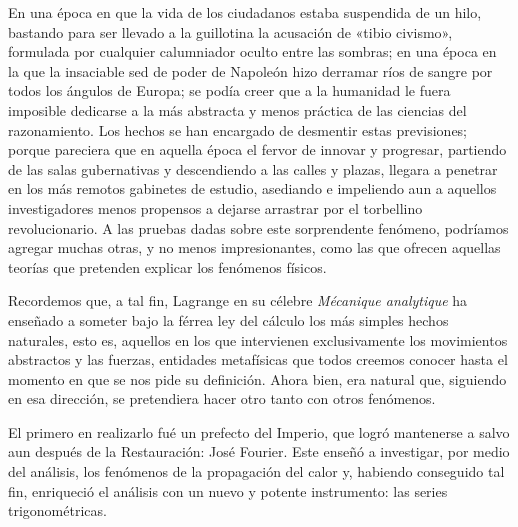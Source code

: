\documentclass[a4paper, 12pt, draft]{article}
\begin{document}
{{En una época en que la vida de los ciudadanos estaba suspendida de un hilo, bastando para ser llevado a la guillotina la acusación de «tibio civismo», formulada por cualquier calumniador oculto entre las sombras; en una época en la que la insaciable sed de poder de Napoleón hizo derramar ríos de sangre por todos los ángulos de Europa; se podía creer que a la humanidad le fuera imposible dedicarse a la más abstracta y menos práctica de las ciencias del razonamiento. Los hechos se han encargado de desmentir estas previsiones; porque pareciera que en aquella época el fervor de innovar y progresar, partiendo de las salas gubernativas y descendiendo a las
calles y plazas, llegara a penetrar en los más remotos gabinetes de estudio, asediando e impeliendo aun a aquellos investigadores menos propensos a dejarse arrastrar por el torbellino revolucionario. A las pruebas dadas sobre este sorprendente fenómeno, podríamos agregar muchas otras, y no menos impresionantes, como las que ofrecen aquellas teorías que pretenden explicar los fenómenos físicos.

Recordemos que, a tal fin, Lagrange en su célebre
\textit{ Mécanique analytique} ha enseñado a someter bajo
la férrea ley del cálculo los más simples hechos naturales, esto es, aquellos en los que intervienen exclusivamente los movimientos abstractos y las fuerzas, entidades metafísicas que todos creemos conocer hasta el momento en que se nos pide su definición. Ahora bien, era natural que, siguiendo en esa dirección, se pretendiera hacer otro tanto con otros fenómenos.

El primero en realizarlo fué un prefecto del Imperio, que logró mantenerse a salvo aun después de la Restauración: José Fourier. Este enseñó a investigar, por medio del análisis, los fenómenos de la propagación del calor y, habiendo conseguido tal fin, enriqueció el análisis con un nuevo y potente instrumento: las series trigonométricas.

}}
\end{document}
